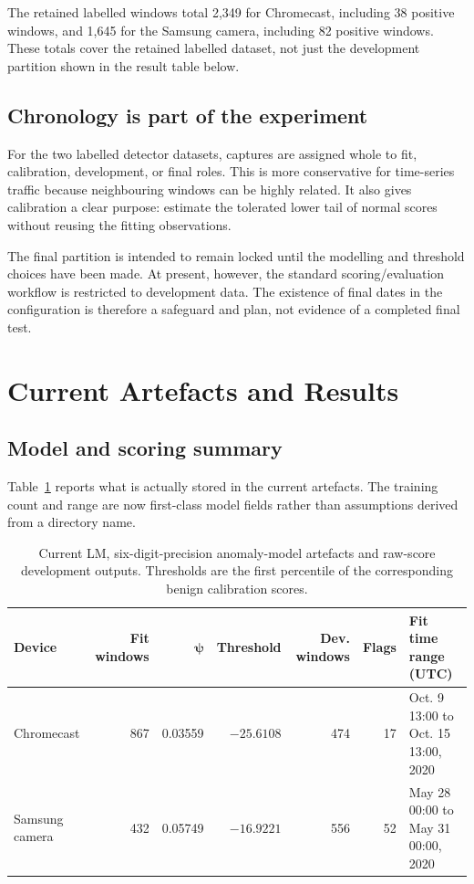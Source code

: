 \documentclass[11pt,a4paper]{article}
\begin{document}
The retained labelled windows total 2,349 for Chromecast, including 38 positive windows, and 1,645 for the Samsung camera, including 82 positive windows. These totals cover the retained labelled dataset, not just the development partition shown in the result table below.

\subsection{Chronology is part of the experiment}

For the two labelled detector datasets, captures are assigned whole to fit, calibration, development, or final roles. This is more conservative for time-series traffic because neighbouring windows can be highly related. It also gives calibration a clear purpose: estimate the tolerated lower tail of normal scores without reusing the fitting observations.

The final partition is intended to remain locked until the modelling and threshold choices have been made. At present, however, the standard scoring/evaluation workflow is restricted to development data. The existence of final dates in the configuration is therefore a safeguard and plan, not evidence of a completed final test.

\section{Current Artefacts and Results}

\subsection{Model and scoring summary}

Table~\ref{tab:modelresults} reports what is actually stored in the current artefacts. The training count and range are now first-class model fields rather than assumptions derived from a directory name.

\begin{table}[ht]
\centering
\small
\begin{tabularx}{\textwidth}{>{\raggedright\arraybackslash}p{} r r r r r X}
\toprule
\textbf{Device} & \textbf{Fit windows} & $\boldsymbol{\psi}$ & \textbf{Threshold} & \textbf{Dev. windows} & \textbf{Flags} & \textbf{Fit time range (UTC)} \\
\midrule
Chromecast & 867 & 0.03559 & $-25.6108$ & 474 & 17 & Oct. 9 13:00 to Oct. 15 13:00, 2020 \\
Samsung camera & 432 & 0.05749 & $-16.9221$ & 556 & 52 & May 28 00:00 to May 31 00:00, 2020 \\
\bottomrule
\end{tabularx}
\caption{Current LM, six-digit-precision anomaly-model artefacts and raw-score development outputs. Thresholds are the first percentile of the corresponding benign calibration scores.}
\label{tab:modelresults}
\end{table}
\end{document}
